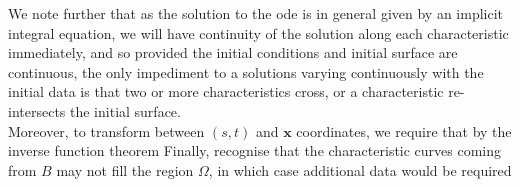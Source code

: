 \documentclass{article}
\begin{document}
We note further that as the solution to the ode is in general given by an implicit integral equation, we will have continuity of the solution along each characteristic immediately, and so provided the initial conditions and initial surface are continuous, the only impediment to a solutions varying continuously with the initial data is that two or more characteristics cross, or a characteristic re-intersects the initial surface.  \\
Moreover, to transform between $(s,t)$ and $\bm{x}$ coordinates, we require that by the inverse function theorem 
Finally, recognise that the characteristic curves coming from $B$ may not fill the region $\Omega$, in which case additional data would be required 
\end{document}
